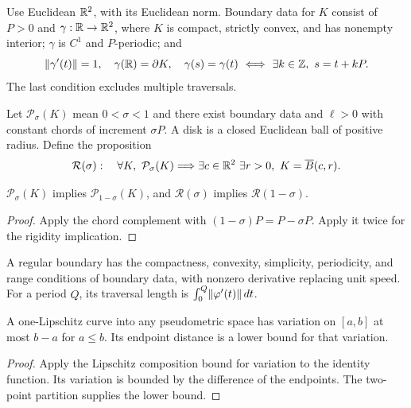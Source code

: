 \begin{definition}
\label{def:boundary}
\leanok
Use Euclidean $\mathbb{R}^2$, with its Euclidean norm. Boundary data for $K$ consist
of $P>0$ and $\gamma:\mathbb{R}\to\mathbb{R}^2$, where $K$ is compact, strictly convex,
and has nonempty interior; $\gamma$ is $C^1$ and $P$-periodic; and
\[
 \lVert \gamma'(t)\rVert=1,\quad \gamma(\mathbb{R})=\partial K,\quad
 \gamma(s)=\gamma(t)\ \Longleftrightarrow\
 \exists k\in\mathbb{Z},\ s=t+kP.
\]
The last condition excludes multiple traversals.
\end{definition}

\begin{definition}
\label{def:perimetral}
\leanok
{}
Let $\mathcal P_\sigma(K)$ mean $0<\sigma<1$ and there exist boundary data
and $\ell>0$ with constant chords of increment $\sigma P$. A disk is a
closed Euclidean ball of positive radius. Define the proposition
\[
 \mathcal R(\sigma):\quad
 \forall K,\ \mathcal P_\sigma(K)\Longrightarrow
 \exists c\in\mathbb{R}^2\ \exists r>0,\ K=\overline B(c,r).
\]
\end{definition}

\begin{lemma}
\label{lem:complement}
\leanok
{}
$\mathcal P_\sigma(K)$ implies $\mathcal P_{1-\sigma}(K)$, and
$\mathcal R(\sigma)$ implies $\mathcal R(1-\sigma)$.
\end{lemma}
\begin{proof}
\leanok
Apply the chord complement with $(1-\sigma)P=P-\sigma P$.
Apply it twice for the rigidity implication.
\end{proof}

\begin{definition}
\label{def:regular-boundary}
\leanok
{}
A regular boundary has the compactness, convexity, simplicity, periodicity,
and range conditions of boundary data, with nonzero derivative replacing
unit speed. For a period $Q$, its traversal length is
$\int_0^Q\lVert \varphi'(t)\rVert\,dt$.
\end{definition}

\begin{lemma}
\label{lem:lipschitz-variation}
\leanok
A one-Lipschitz curve into any pseudometric space has variation on
$[a,b]$ at most $b-a$ for $a\leq b$. Its endpoint distance is a lower
bound for that variation.
\end{lemma}
\begin{proof}
\leanok
Apply the Lipschitz composition bound for variation to the identity
function. Its variation is bounded by the difference of the endpoints.
The two-point partition supplies the lower bound.
\end{proof}

